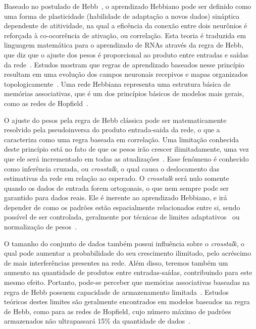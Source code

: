 \documentclass[conference]{IEEEtran}
\begin{document}
	Baseado no postulado de Hebb~\cite{hebb1949organization}, o aprendizado Hebbiano pode ser definido como uma forma de plasticidade (habilidade de adaptação a novos dados) sináptica dependente de atitividade, na qual a eficência da conexão entre dois neurônios é reforçada à co-ocorrência de ativação, ou correlação. Esta teoria é traduzida em linguagem matemática para o aprendizado de RNAs através da regra de Hebb, que diz que o ajuste dos pesos é proporcional ao produto entre entradas e saídas da rede~\cite{gerstner2002mathematical}. Estudos mostram que regras de aprendizado baseados nesse princípio resultam em uma evolução dos campos neuronais recepivos e mapas organizados topologicamente~\cite{kempter1999hebbian}. Uma rede Hebbiana representa uma estrutura básica de memórias associativas, que é um dos princípios básicos de modelos mais gerais, como as redes de Hopfield~\cite{hopfield1982neural}.
		
	O ajuste do pesos pela regra de Hebb clássica pode ser matematicamente resolvido pela pseudoinversa do produto entrada-saida da rede, o que a caracteriza como uma regra baseada em correlação. Uma limitação conhecida deste princípio está no fato de que os pesos irão crescer ilimitadamente, uma vez que ele será incrementado em todas as atualizações~\cite{choe2013hebbian}. Esse fenômeno é conhecido como inferência cruzada, ou \textit{crosstalk}, o qual causa o deslocamento das estimativas da rede em relação ao esperado. O \textit{crosstalk} será nulo somente quando os dados de entrada forem ortogonais, o que nem sempre pode ser garantido para dados reais. Ele é inerente ao aprendizado Hebbiano, e irá depender de como os padrões estão espacialmente relacionados entre si, sendo possível de ser controlada, geralmente por técnicas de limites adaptativos~\cite{bienenstock1982theory} ou normalização de pesos~\cite{miller1994role}.
	
	O tamanho do conjunto de dados também possui influência sobre o \textit{crosstalk}, o qual pode aumentar a probabilidade do seu crescimento ilimitado, pelo acréscimo de mais interferências presentes na rede. Além disso, teremos também um aumento na quantidade de produtos entre entradas-saídas, contribuindo para este mesmo efeito. Portanto, pode-se perceber que memórias associativas baseadas na regra de Hebb possuem capacidade de armazenamento limitada~\cite{jain1996artificial}. Estudos teóricos destes limites são geralmente encontrados em modelos baseados na regra de Hebb, como para as redes de Hopfield, cujo número máximo de padrões armazenados não ultrapassará 15\% da quantidade de dados~\cite{mceliece1987capacity}.
	
\end{document}
